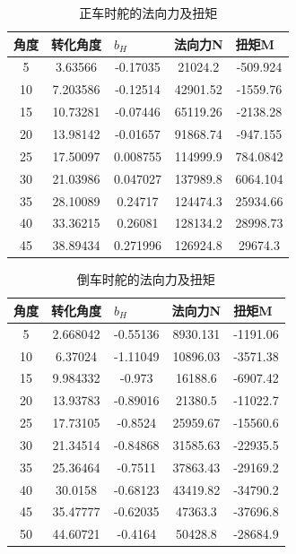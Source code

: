 \documentclass[a4paper,UTF8]{article}
\begin{document}
\begin{table}[htbp]
	\centering
	\begin{tabular}{ccccc}
		\hline
		\multicolumn{1}{l}{角度} & \multicolumn{1}{l}{转化角度} & \multicolumn{1}{l}{$b_{H}$} & \multicolumn{1}{l}{法向力N} & \multicolumn{1}{l}{扭矩M} \\
		\hline
    5     & 3.63566 & -0.17035 & 21024.2 & -509.924 \\
10    & 7.203586 & -0.12514 & 42901.52 & -1559.76 \\
15    & 10.73281 & -0.07446 & 65119.26 & -2138.28 \\
20    & 13.98142 & -0.01657 & 91868.74 & -947.155 \\
25    & 17.50097 & 0.008755 & 114999.9 & 784.0842 \\
30    & 21.03986 & 0.047027 & 137989.8 & 6064.104 \\
35    & 28.10089 & 0.24717 & 124474.3 & 25934.66 \\
40    & 33.36215 & 0.26081 & 128134.2 & 28998.73 \\
45    & 38.89434 & 0.271996 & 126924.8 & 29674.3 \\
		\hline
	\end{tabular}%
	\caption{正车时舵的法向力及扭矩}
	\label{tab:zfxl}
\end{table}

\begin{table}[htbp]
	\centering
	\begin{tabular}{ccccc}
		\hline
		\multicolumn{1}{l}{角度} & \multicolumn{1}{l}{转化角度} & \multicolumn{1}{l}{$b_{H}$} & \multicolumn{1}{l}{法向力N} & \multicolumn{1}{l}{扭矩M} \\
		\hline
    5     & 2.668042 & -0.55136 & 8930.131 & -1191.06 \\
10    & 6.37024 & -1.11049 & 10896.03 & -3571.38 \\
15    & 9.984332 & -0.973 & 16188.6 & -6907.42 \\
20    & 13.93783 & -0.89016 & 21380.5 & -11022.7 \\
25    & 17.73105 & -0.8524 & 25959.67 & -15560.6 \\
30    & 21.34514 & -0.84868 & 31585.63 & -22935.5 \\
35    & 25.36464 & -0.7511 & 37863.43 & -29169.2 \\
40    & 30.0158 & -0.68123 & 43419.82 & -34790.2 \\
45    & 35.47777 & -0.62035 & 47363.3 & -37696.8 \\
50    & 44.60721 & -0.4164 & 50428.8 & -28684.9 \\
		\hline
	\end{tabular}%
	\caption{倒车时舵的法向力及扭矩}
	\label{tab:dfxl}
\end{table}
\end{document}
